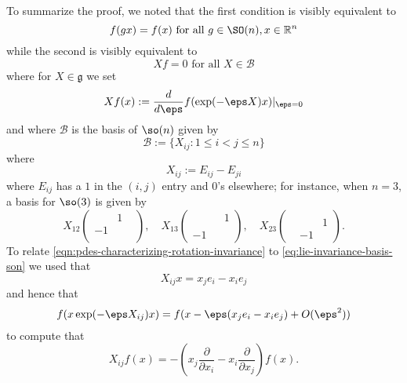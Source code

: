 \documentclass[reqno]{amsart} 
\begin{document}
To summarize the proof, we noted that the first condition
is visibly equivalent to
\begin{equation}\label{eq:group-invariance-son}
    f(g x) = f(x) \text{ for all } g \in \SO(n), x \in \mathbb{R}^n
\end{equation}
while the second is visibly equivalent to
\begin{equation}\label{eq:lie-invariance-basis-son}
    X f = 0 \text{ for all } X \in \mathcal{B}
\end{equation}
where for $X \in \mathfrak{g}$
we set
\begin{equation*}
  X f(x) := \frac{d}{d \eps} f(\exp(-\eps  X) x) |_{\eps=0}
\end{equation*}
and
where
$\mathcal{B}$ is the basis of $\so(n)$
given by
\begin{equation*}
  \mathcal{B} := \{X_{i j} : 1 \leq i < j \leq n\}
\end{equation*}
where
\begin{equation*}
  X_{i j} := E_{i j} - E_{j i}
\end{equation*}
where
$E_{i j}$ has a $1$ in the $(i,j)$ entry and $0$'s elsewhere;
for instance,
when $n = 3$,
a basis for $\so(3)$ is given by
\begin{equation*}
  X_{12}
  \begin{pmatrix}
    & 1 &  \\
    -1 &  &  \\
    &  & 
  \end{pmatrix}
,
  \quad 
  X_{13}
  \begin{pmatrix}
    &  & 1\\
    &  &  \\
    -1 &  & 
  \end{pmatrix}
,
  \quad 
  X_{23}
  \begin{pmatrix}
    &  & \\
    &  & 1 \\
    & -1  & 
  \end{pmatrix}
.
\end{equation*}
To relate \eqref{eqn:pdes-characterizing-rotation-invariance}
to \eqref{eq:lie-invariance-basis-son}
we used that
\begin{equation*}
  X_{i j} x =
  x_j e_i - x_i e_j
\end{equation*}
and hence that
\begin{equation*}
  f(x \exp(-\eps X_{i j}) x)
  = f(x  -  \eps  (x_j e_i - x_i e_j) + O(\eps ^2))
\end{equation*}
to compute that
\begin{equation*}
  X_{i j} f(x) = -
  (x_j \frac{\partial }{\partial x_i}
  - x_i \frac{\partial }{\partial x_j}
  ) f(x).
\end{equation*}
\end{document}
